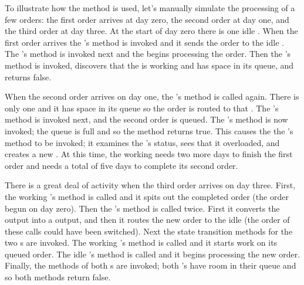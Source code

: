 To illustrate how the  method is used, let's manually simulate the processing of a few orders: the first order arrives at day zero, the second order at day one, and the third order at day three. At the start of day zero there is one idle . When the first order arrives the 's  method is invoked and it sends the order to the idle . The 's  method is invoked next and the  begins processing the order. Then the 's  method is invoked, discovers that the  is working and has space in its queue, and returns false. 

When the second order arrives on day one, the 's  method is called again. There is only one  and it has space in its queue so the order is routed to that . The 's  method is invoked next, and the second order is queued. The 's  method is now invoked; the queue is full and so the method returns true. This causes the the 's  method to be invoked; it examines the 's status, sees that it overloaded, and creates a new .
At this time, the working  needs two more days to finish the first order and needs a total of five days to complete its second order.

There is a great deal of activity when the third order arrives on day three. First, the working 's  method is called and it spits out the completed order (the order begun on day zero). 
Then the 's  method is called twice. First it converts the  output into a  output, and then it routes the new order to the idle  (the order of these  calls could have been switched). Next the state transition methods for the two s are invoked. The working 's  method is called and it starts work on its queued order. The idle 's  method is called and it begins processing the new order. Finally, the  methods of both s are invoked; both 's have room in their queue and so both methods return false. 

